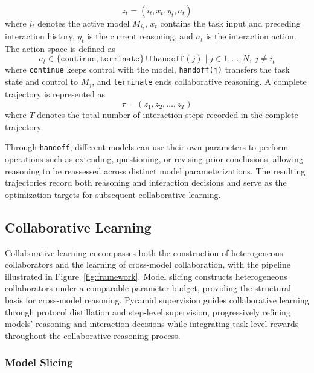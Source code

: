 \documentclass{article} %
\begin{document}
\vspace{-1em}

\begin{equation}
z_t = (i_t, x_t, y_t, a_t)
\end{equation}
where $i_t$ denotes the active model $M_{i_t}$, $x_t$ contains the task input and preceding interaction history, $y_t$ is the current reasoning, and $a_t$ is the interaction action. The action space is defined as
\begin{equation}
a_t \in \{\texttt{continue},\texttt{terminate}\}
\cup {\texttt{handoff}(j) \mid j \in {1,\ldots,N},\ j \neq i_t}
\end{equation}
where \texttt{continue} keeps control with the model, \texttt{handoff(j)} transfers the task state and control to $M_j$, and \texttt{terminate} ends collaborative reasoning. A complete trajectory is represented as
\begin{equation}
\tau = (z_1,z_2,\ldots,z_T)
\end{equation}
where $T$ denotes the total number of interaction steps recorded in the complete trajectory.

Through \texttt{handoff}, different models can use their own parameters to perform operations such as extending, questioning, or revising prior conclusions, allowing reasoning to be reassessed across distinct model parameterizations. The resulting trajectories record both reasoning and interaction decisions and serve as the optimization targets for subsequent collaborative learning.

\subsection{Collaborative Learning}
\label{sec:collaborative_learning}

Collaborative learning encompasses both the construction of heterogeneous collaborators and the learning of cross-model collaboration, with the pipeline illustrated in Figure~\ref{fig:framework}. Model slicing constructs heterogeneous collaborators under a comparable parameter budget, providing the structural basis for cross-model reasoning. Pyramid supervision guides collaborative learning through protocol distillation and step-level supervision, progressively refining models' reasoning and interaction decisions while integrating task-level rewards throughout the collaborative reasoning process.

\subsubsection{Model Slicing}
\label{sec:model_slicing}
\end{document}
